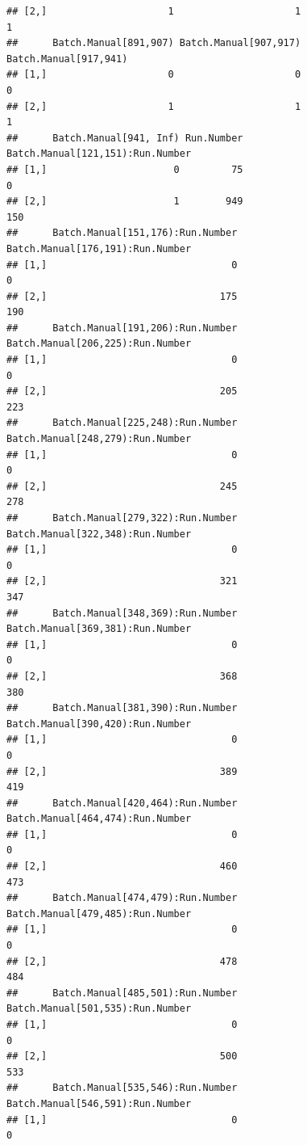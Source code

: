 \documentclass[]{article}
\begin{document}
\begin{verbatim}
## [2,]                     1                     1                    1
##      Batch.Manual[891,907) Batch.Manual[907,917) Batch.Manual[917,941)
## [1,]                     0                     0                     0
## [2,]                     1                     1                     1
##      Batch.Manual[941, Inf) Run.Number Batch.Manual[121,151):Run.Number
## [1,]                      0         75                                0
## [2,]                      1        949                              150
##      Batch.Manual[151,176):Run.Number Batch.Manual[176,191):Run.Number
## [1,]                                0                                0
## [2,]                              175                              190
##      Batch.Manual[191,206):Run.Number Batch.Manual[206,225):Run.Number
## [1,]                                0                                0
## [2,]                              205                              223
##      Batch.Manual[225,248):Run.Number Batch.Manual[248,279):Run.Number
## [1,]                                0                                0
## [2,]                              245                              278
##      Batch.Manual[279,322):Run.Number Batch.Manual[322,348):Run.Number
## [1,]                                0                                0
## [2,]                              321                              347
##      Batch.Manual[348,369):Run.Number Batch.Manual[369,381):Run.Number
## [1,]                                0                                0
## [2,]                              368                              380
##      Batch.Manual[381,390):Run.Number Batch.Manual[390,420):Run.Number
## [1,]                                0                                0
## [2,]                              389                              419
##      Batch.Manual[420,464):Run.Number Batch.Manual[464,474):Run.Number
## [1,]                                0                                0
## [2,]                              460                              473
##      Batch.Manual[474,479):Run.Number Batch.Manual[479,485):Run.Number
## [1,]                                0                                0
## [2,]                              478                              484
##      Batch.Manual[485,501):Run.Number Batch.Manual[501,535):Run.Number
## [1,]                                0                                0
## [2,]                              500                              533
##      Batch.Manual[535,546):Run.Number Batch.Manual[546,591):Run.Number
## [1,]                                0                                0

\end{verbatim}
\end{document}
